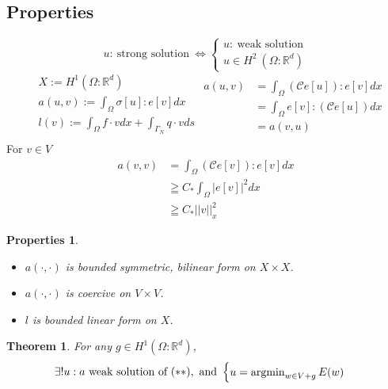 \documentclass[a4paper,12pt]{article}
\newtheorem{prop}{Properties}
\newtheorem{theorem}{Theorem}
\newcommand{\R}{\mathbb{R}}
\newcommand{\Cmod}{\mathcal{C}}
\newcommand{\argmin}{\operatornamewithlimits{argmin}}
\begin{document}
\subsection{Properties}
\begin{equation*}
u:\ \text{strong solution}\ \Leftrightarrow \begin{cases}
u:\ \text{weak solution}\\
u\in H^2\ (\Omega : \R^d)
\end{cases}
\end{equation*}
\begin{equation*}
\begin{aligned}
&X:= H^1(\Omega : \R^d)\\
&a(u,v) := \int_\Omega \sigma[u] : e[v] dx\\
&l(v) := \int_\Omega f\cdot v dx + \int_{\Gamma_N} q \cdot v ds\\
\end{aligned}
\begin{aligned}
a(u,v) &= \int_\Omega (\Cmod e[u]) : e[v] dx\\
&= \int_\Omega e[v] : (\Cmod e[u]) dx\\
&= a(v,u)
\end{aligned}
\end{equation*}
For $v \in V$
\begin{equation*}
\begin{aligned}
a(v,v) &= \int_\Omega (\Cmod e[v]) : e[v] dx\\
&\geqq C_* \int_\Omega |e[v]|^2 dx\\
&\geqq C_* ||v||^2_x
\end{aligned}
\end{equation*}
\begin{prop}
	\begin{itemize}
		\item $a(\cdot,\cdot)$ is bounded symmetric, bilinear form on $X \times X$.
		\item $a(\cdot,\cdot)$ is coercive on $V \times V$.
		\item $l$ is bounded linear form on $X$.
	\end{itemize}
\end{prop}
\begin{theorem}
	For any $g\in H^1(\Omega : \R^d)$,
	\begin{equation*}
	\exists! u:a\ \text{weak solution of}\ (**),\ \text{and}\ \begin{cases}
	u=\argmin_{w\in V+g}E(w)
	\end{cases}
	\end{equation*}
\end{theorem}
\end{document}
